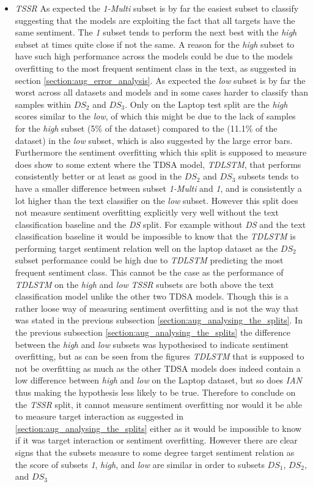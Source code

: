 \begin{itemize}
    \item \textit{TSSR} As expected the \textit{1-Multi} subset is by far the easiest subset to classify suggesting that the models are exploiting the fact that all targets have the same sentiment. The \textit{1} subset tends to perform the next best with the \textit{high} subset at times quite close if not the same. A reason for the \textit{high} subset to have such high performance across the models could be due to the models overfitting to the most frequent sentiment class in the text, as suggested in section \ref{section:aug_error_analysis}. As expected the \textit{low} subset is by far the worst across all datasets and models and in some cases harder to classify than samples within $DS_2$ and $DS_3$. Only on the Laptop test split are the \textit{high} scores similar to the \textit{low}, of which this might be due to the lack of samples for the \textit{high} subset (5\% of the dataset) compared to the (11.1\% of the dataset) in the \textit{low} subset, which is also suggested by the large error bars. Furthermore the sentiment overfitting which this split is supposed to measure does show to some extent where the TDSA model, \textit{TDLSTM}, that performs consistently better or at least as good in the $DS_2$ and $DS_3$ subsets tends to have a smaller difference between subset \textit{1-Multi} and \textit{1}, and is consistently a lot higher than the text classifier on the \textit{low} subset. However this split does not measure sentiment overfitting explicitly very well without the text classification baseline and the \textit{DS} split. For example without \textit{DS} and the text classification baseline it would be impossible to know that the \textit{TDLSTM} is performing target sentiment relation well on the laptop dataset as the $DS_2$ subset performance could be high due to \textit{TDLSTM} predicting the most frequent sentiment class. This cannot be the case as the performance of \textit{TDLSTM} on the \textit{high} and \textit{low} \textit{TSSR} subsets are both above the text classification model unlike the other two TDSA models. Though this is a rather loose way of measuring sentiment overfitting and is not the way that was stated in the previous subsection \ref{section:aug_analysing_the_splits}. In the previous  subsection \ref{section:aug_analysing_the_splits} the difference between the \textit{high} and \textit{low} subsets was hypothesised to indicate sentiment overfitting, but as can be seen from the figures \textit{TDLSTM} that is supposed to not be overfitting as much as the other TDSA models does indeed contain a low difference between \textit{high} and \textit{low} on the Laptop dataset, but so does \textit{IAN} thus making the hypothesis less likely to be true. Therefore to conclude on the \textit{TSSR} split, it cannot measure sentiment overfitting nor would it be able to measure target interaction as suggested in \ref{section:aug_analysing_the_splits} either as it would be impossible to know if it was target interaction or sentiment overfitting. However there are clear signs that the subsets measure to some degree target sentiment relation as the score of subsets \textit{1}, \textit{high}, and \textit{low} are similar in order to subsets $DS_1$, $DS_2$, and $DS_3$ 
\end{itemize}
